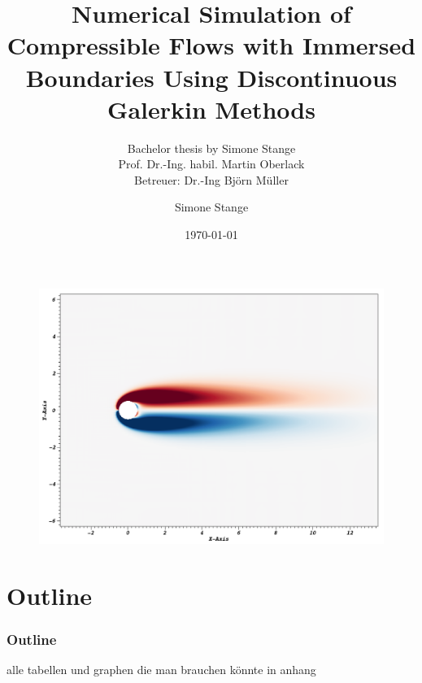 \documentclass[accentcolor=tud7b,colorbacktitle,inverttitle,landscape,german,presentation,t]{tudbeamer}
\begin{document}
\title{Numerical Simulation of Compressible Flows with Immersed Boundaries Using Discontinuous Galerkin Methods}
\subtitle{Bachelor thesis by Simone Stange\\Prof. Dr.-Ing. habil. Martin Oberlack\\Betreuer: Dr.-Ing Björn Müller}

\author[Simone Stange]{Simone Stange}


\date{\today}

\begin{titleframe}
	\begin{figure}[htbp] 
	    \centering
		\includegraphics[height=0.38\textwidth]{img/Re40DG3CpD60} 
	\end{figure}
\end{titleframe}

\section*{Outline}
\begin{frame}
	\frametitle{Outline}
	\tableofcontents
\end{frame}





\appendix
		\begin{frame}
			alle tabellen und graphen die man brauchen könnte in anhang
		\end{frame}		
\begin{frame}

\end{frame}
\end{document}
